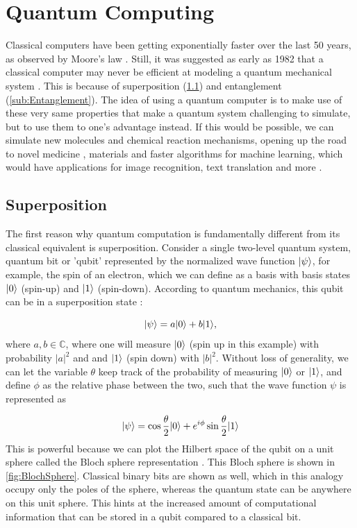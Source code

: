 \section{Quantum Computing}

Classical computers have been getting exponentially faster over the last 50 years, as observed by Moore's law \cite{Moore1965}. 
Still, it was suggested as early as 1982 that a classical computer may never be efficient at modeling a quantum mechanical system \cite{Feynman1982}. 
This is because of superposition (\cref{sub:Superposition}) and entanglement (\cref{sub:Entanglement}). 
The idea of using a quantum computer is to make use of these very same properties that make a quantum system challenging to simulate, but to use them to one's advantage instead. 
If this would be possible, we can simulate new molecules and chemical reaction mechanisms, opening up the road to novel medicine \cite{Robert2021}, materials \cite{Ma2020} and faster algorithms for machine learning, which would have applications for image recognition, text translation and more \cite{Huang2021}.

\subsection{Superposition}\label{sub:Superposition}

The first reason why quantum computation is fundamentally different from its classical equivalent is superposition.
Consider a single two-level quantum system, quantum bit or 'qubit' represented by the normalized wave function $\lvert\psi\rangle$, for example, the spin of an electron, which we can define as a basis with basis states $\lvert0\rangle$ (spin-up) and $\lvert1\rangle$ (spin-down). 
According to quantum mechanics, this qubit can be in a superposition state \cite{Griffiths2004}:

\begin{equation}\label{eq:SuperPositionBasic}
	\lvert\psi\rangle=a\lvert0\rangle+b\lvert1\rangle,
\end{equation}
where $a,b \in \mathbb{C}$, where one will measure $\lvert0\rangle$ (spin up in this example) with probability $|a|^2$ and and $\lvert1\rangle$ (spin down) with $|b|^2$. 
Without loss of generality, we can let the variable $\theta$ keep track of the probability of measuring $\lvert0\rangle$ or $\lvert1\rangle$, and define $\phi$ as the relative phase between the two, such that the wave function $\psi$ is represented as

\begin{equation}\label{eq:BlochSphere}
	\lvert\psi\rangle = 
	\cos{\frac{\theta}{2}} \lvert0\rangle + e^{i \phi} \sin{\frac{\theta}{2}} \lvert1\rangle
\end{equation}
This is powerful because we can plot the Hilbert space of the qubit on a unit sphere called the Bloch sphere representation \cite{Nielsen2011}.
This Bloch sphere is shown in \cref{fig:BlochSphere}.
Classical binary bits are shown as well, which in this analogy occupy only the poles of the sphere, whereas the quantum state can be anywhere on this unit sphere. 
This hints at the increased amount of computational information that can be stored in a qubit compared to a classical bit. 

